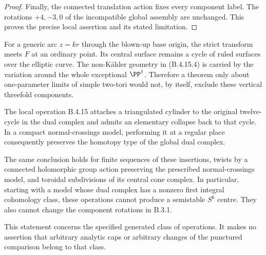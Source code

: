 \begin{proof}
Finally, the connected translation action fixes every
component label. The rotations $+4,-3,0$ of the
incompatible global assembly are unchanged. This proves
the precise local assertion and its stated limitation.
\end{proof}

\begin{remark}
For a generic arc $z=kr$ through the blown-up base
origin, the strict transform meets $F$ at an ordinary
point. Its central surface remains a cycle of ruled
surfaces over the elliptic curve. The non-K\"ahler
geometry in (B.4.15.4) is carried by the variation
around the whole exceptional $\PP^1$. Therefore a
theorem only about one-parameter limits of simple
two-tori would not, by itself, exclude these vertical
threefold components.
\end{remark}

\begin{proposition}\label{push:src:B.4.16}
\label{push:B416}
The local operation B.4.15 attaches a triangulated
cylinder to the original twelve-cycle in the dual
complex and admits an elementary collapse back to that
cycle. In a compact normal-crossings model, performing
it at a regular place consequently preserves the
homotopy type of the global dual complex.

The same conclusion holds for finite sequences of these
insertions, twists by a connected holomorphic group
action preserving the prescribed normal-crossings
model, and toroidal subdivisions of its central cone
complex. In particular, starting with a model whose
dual complex has a nonzero first integral cohomology
class, these operations cannot produce a semistable
$S^6$ centre. They also cannot change the component
rotations in B.3.1.

This statement concerns the specified generated class
of operations. It makes no assertion that arbitrary
analytic caps or arbitrary changes of the punctured
comparison belong to that class.
\end{proposition}

